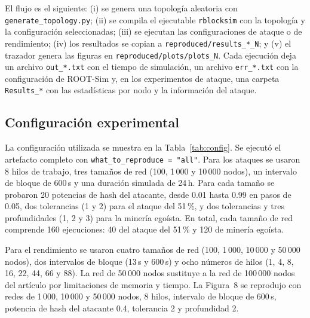 \documentclass[11pt,a4paper,oneside]{article}
\begin{document}
El flujo es el siguiente: (i) se genera una topología aleatoria con \texttt{generate\_topology.py}; (ii) se compila el ejecutable \texttt{rblocksim} con la topología y la configuración seleccionadas; (iii) se ejecutan las configuraciones de ataque o de rendimiento; (iv) los resultados se copian a \texttt{reproduced/results\_*\_N}; y (v) el trazador genera las figuras en \texttt{reproduced/plots/plots\_N}. Cada ejecución deja un archivo \texttt{out\_*.txt} con el tiempo de simulación, un archivo \texttt{err\_*.txt} con la configuración de ROOT-Sim y, en los experimentos de ataque, una carpeta \texttt{Results\_*} con las estadísticas por nodo y la información del ataque.

\subsection{Configuración experimental}

La configuración utilizada se muestra en la Tabla~\ref{tab:config}. Se ejecutó el artefacto completo con \texttt{what\_to\_reproduce = "all"}. Para los ataques se usaron 8 hilos de trabajo, tres tamaños de red (100, 1\,000 y 10\,000 nodos), un intervalo de bloque de 600\,s y una duración simulada de 24\,h. Para cada tamaño se probaron 20 potencias de hash del atacante, desde 0.01 hasta 0.99 en pasos de 0.05, dos tolerancias (1 y 2) para el ataque del 51\,\%, y dos tolerancias y tres profundidades (1, 2 y 3) para la minería egoísta. En total, cada tamaño de red comprende 160 ejecuciones: 40 del ataque del 51\,\% y 120 de minería egoísta.

Para el rendimiento se usaron cuatro tamaños de red (100, 1\,000, 10\,000 y 50\,000 nodos), dos intervalos de bloque (13\,s y 600\,s) y ocho números de hilos (1, 4, 8, 16, 22, 44, 66 y 88). La red de 50\,000 nodos sustituye a la red de 100\,000 nodos del artículo por limitaciones de memoria y tiempo. La Figura~8 se reprodujo con redes de 1\,000, 10\,000 y 50\,000 nodos, 8 hilos, intervalo de bloque de 600\,s, potencia de hash del atacante 0.4, tolerancia 2 y profundidad 2.
\end{document}
